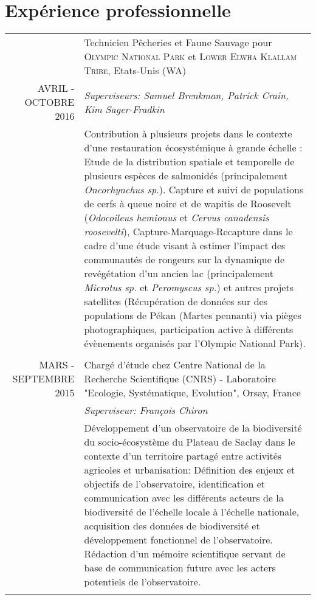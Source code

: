 \documentclass[a4paper,10pt]{article}
\begin{document}
\section{Expérience professionnelle}
\begin{tabular}{r|p{11cm}}

 \emph & Technicien Pêcheries et Faune Sauvage pour \textsc{Olympic National Park} et \textsc{Lower Elwha Klallam Tribe}, Etats-Unis (WA) \\\textsc{AVRIL - OCTOBRE 2016}&\emph{Superviseurs: Samuel Brenkman, Patrick Crain, Kim Sager-Fradkin }\\&\footnotesize{Contribution à plusieurs projets dans le contexte d'une restauration écosystémique à grande échelle : Etude de la distribution spatiale et temporelle de plusieurs espèces de salmonidés (principalement \textit{Oncorhynchus sp}.). Capture et suivi de populations de cerfs à queue noire et de wapitis de Roosevelt (\textit{Odocoileus hemionus} et \textit{Cervus canadensis roosevelti}), Capture-Marquage-Recapture dans le cadre d'une étude visant à estimer l'impact des communautés de rongeurs sur la dynamique de revégétation d'un ancien lac (principalement \textit{Microtus sp.} et \textit{Peromyscus sp.}) et autres projets satellites (Récupération de données sur des populations de Pékan (Martes pennanti) via pièges photographiques, participation active à différents évènements organisés par l'Olympic National Park).  }\\\multicolumn{2}{c}{} \\

 \textsc{MARS - SEPTEMBRE 2015} & Chargé d'étude chez Centre National de la Recherche Scientifique (CNRS) - Laboratoire "Ecologie, Systématique, Evolution", Orsay, France \\&\emph{Superviseur: François Chiron}\\&\footnotesize{Développement d'un observatoire de la biodiversité du socio-écosystème du Plateau de Saclay dans le contexte d'un territoire partagé entre activités agricoles et urbanisation: Définition des enjeux et objectifs de l'observatoire, identification et communication avec les différents acteurs de la biodiversité de l'échelle locale à l'échelle nationale, acquisition des données de biodiversité et développement fonctionnel de l'observatoire. Rédaction d'un mémoire scientifique servant de base de communication future avec les acters potentiels de l'observatoire.}\\\multicolumn{2}{c}{} \\


\end{tabular}
\end{document}
